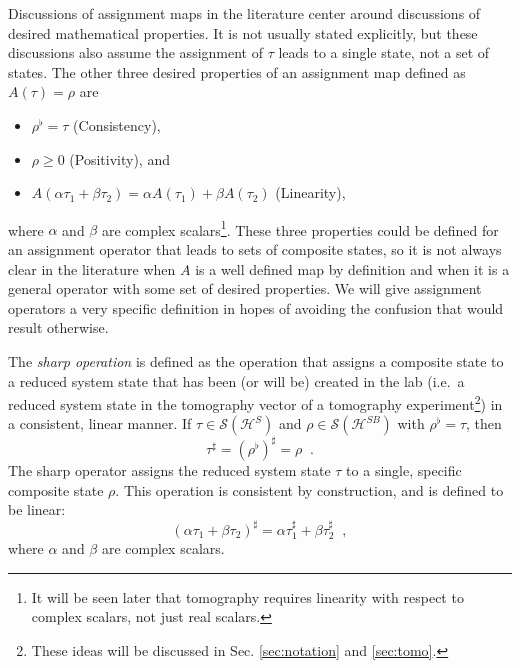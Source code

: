 Discussions of assignment maps in the literature center around discussions of desired mathematical properties.  It is not usually stated explicitly, but these discussions also assume the assignment of $\tau$ leads to a single state, not a set of states.  The other three desired properties of an assignment map defined as $A(\tau) = \rho$ are
\begin{itemize}
\item $\rho^\flat = \tau$  (Consistency),
\item $\rho \ge 0$  (Positivity), and
\item $A(\alpha\tau_1+\beta\tau_2) = \alpha A(\tau_1) + \beta A(\tau_2)$  (Linearity),
\end{itemize}
where $\alpha$ and $\beta$ are complex scalars\footnote{It will be seen later that tomography requires linearity with respect to complex scalars, not just real scalars.}.  These three properties could be defined for an assignment operator that leads to sets of composite states, so it is not always clear in the literature when $A$ is a well defined map by definition and when it is a general operator with some set of desired properties.  We will give assignment operators a very specific definition in hopes of avoiding the confusion that would result otherwise.

\begin{definition}
The {\em sharp operation} is defined as the operation that assigns a composite state to a reduced system state that has been (or will be) created in the lab (i.e.\ a reduced system state in the tomography vector of a tomography experiment\footnote{These ideas will be discussed in Sec. \ref{sec:notation} and \ref{sec:tomo}.}) in a consistent, linear manner.  If $\tau\in\mathcal{S}(\mathcal{H}^{S})$ and $\rho\in\mathcal{S}(\mathcal{H}^{SB})$ with $\rho^\flat=\tau$, then
$$
\tau^\sharp = (\rho^\flat)^\sharp = \rho\;\;.
$$
The sharp operator assigns the reduced system state $\tau$ to a single, specific composite state $\rho$.  This operation is consistent by construction, and is defined to be linear:
$$
(\alpha\tau_1 + \beta\tau_2)^\sharp = \alpha \tau_1^\sharp+\beta \tau_2^\sharp\;\;,
$$
where $\alpha$ and $\beta$ are complex scalars.  
\end{definition}

